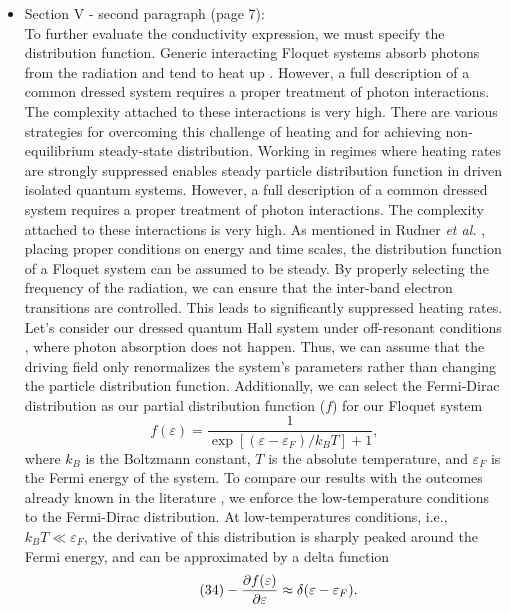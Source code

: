 \documentclass{article}
\begin{document}
\begin{itemize}
  \item Section V - second paragraph (page 7):\\
  {\color{Red}
  To further evaluate the conductivity expression, we must specify the distribution function. Generic interacting Floquet systems absorb photons from the radiation and tend to heat up \cite{seetharam2019,rudner2020}.
  However, a full description of a common dressed system requires a proper treatment of photon interactions. The complexity attached to these interactions is very high. There are various strategies \cite{lindner2017,bukov2015,eckardt2015,kuwahara2016,abanin2017,mori2018,rudner2020} for overcoming this challenge of heating and for achieving non-equilibrium steady-state distribution. Working in regimes where heating rates are strongly suppressed enables steady particle distribution function in driven isolated quantum systems. However, a full description of a common dressed system requires a proper treatment of photon interactions. The complexity attached to these interactions is very high.
  As mentioned in Rudner \textit{et al.} \cite{rudner2020}, placing proper conditions on energy and time scales, the distribution function of a Floquet system can be assumed to be steady. By properly selecting the frequency of the radiation, we can ensure that the inter-band electron transitions are controlled. This leads to significantly suppressed heating rates.
  Let's consider our dressed quantum Hall system under off-resonant conditions \cite{rudner2020,wackerlthesis20}, where photon absorption does not happen. Thus, we can assume that the driving field only renormalizes the system's parameters rather than changing the particle distribution function.
  Additionally, we can select the Fermi-Dirac distribution as our partial distribution function ($f$) for our Floquet system
  \begin{equation} \tag{33}
    f(\varepsilon) = \frac{1}{\exp[(\varepsilon - \varepsilon_F)/k_B T]+1},
  \end{equation}
  where $k_B$ is the Boltzmann constant, $T$ is the absolute temperature, and $\varepsilon_F$ is the Fermi energy of the system. To compare our results with the outcomes already known in the literature \cite{dini16,endo09}, we enforce the low-temperature conditions to the Fermi-Dirac distribution.
  At low-temperatures conditions, i.e., $k_BT \ll \varepsilon_F$, the derivative of this distribution is sharply peaked around the Fermi energy, and can be approximated by a delta function \cite{endo09}
  \begin{equation} \tag{34}
    - \pdv{f(\varepsilon)}{\varepsilon} \approx \delta(\varepsilon - \varepsilon_F).
  \end{equation}
  }
\end{itemize}
\end{document}
